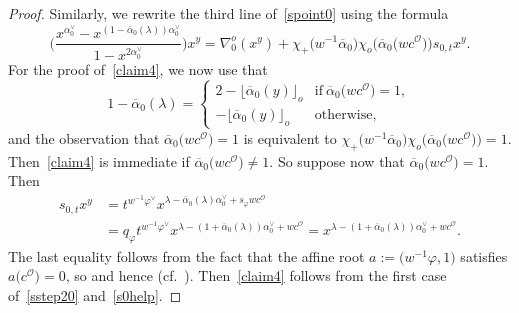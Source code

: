 \documentclass[11pt]{article}
\numberwithin{equation}{section}
\numberwithin{equation}{section}
\begin{document}
\begin{proof}
Similarly, we rewrite the third line of~\eqref{spoint0} using the formula
\begin{equation}\label{claim4}
\Biggl(\frac{x^{\alpha_0^\vee}-x^{(1-\overline{\alpha}_0(\lambda))\alpha_0^\vee}}{1-x^{2\alpha_0^\vee}}\Biggr)x^y=
\nabla_0^o(x^y)+
\chi_+\bigl(w^{-1}\overline{\alpha}_0\bigr)\chi_o\bigl(\overline{\alpha}_0\bigl(wc^\mathcal{O}\bigr)\bigr)
s_{0,t}x^y.
\end{equation}
For the proof of~\eqref{claim4}, we now use that
\begin{equation}\label{sstep20}
1-\overline{\alpha}_0(\lambda)=
\begin{cases}
2-\lfloor\overline{\alpha}_0(y)\rfloor_o &\text{if}\ \overline{\alpha}_0\bigl(wc^\mathcal{O}\bigr)=1,\\
-\lfloor\overline{\alpha}_0(y)\rfloor_o &\text{otherwise},
\end{cases}
\end{equation}
and the observation that $\overline{\alpha}_0\bigl(wc^\mathcal{O}\bigr)=1$ is equivalent to
$\chi_+\bigl(w^{-1}\overline{\alpha}_0\bigr)\chi_o\bigl(\overline{\alpha}_0\bigl(wc^\mathcal{O}\bigr)\bigr)\!=\!1$. Then~\eqref{claim4} is immediate if $\overline{\alpha}_0\bigl(wc^\mathcal{O}\bigr)\not=1$.
So suppose now that $\overline{\alpha}_0\bigl(wc^\mathcal{O}\bigr)=1$. Then
\begin{align}
s_{0,t}x^y
&=t^{w^{-1}\varphi^\vee}x^{\lambda-\overline{\alpha}_0(\lambda)\alpha_0^\vee+s_\varphi wc^\mathcal{O}}\nonumber\\
&=q_\varphi t^{w^{-1}\varphi^\vee}x^{\lambda-(1+\overline{\alpha}_0(\lambda))\alpha_0^\vee+wc^\mathcal{O}}=
x^{\lambda-(1+\overline{\alpha}_0(\lambda))\alpha_0^\vee+wc^\mathcal{O}}.\label{s0help}
\end{align}
The last equality follows from the fact that the affine root $a:=\bigl(w^{-1}\varphi,1\bigr)$ satisfies $a\bigl(c^\mathcal{O}\bigr)=0$, so  and hence
 (cf.~\cite[Lemma 3.4]{SSV2}). Then~\eqref{claim4} follows from the first case of~\eqref{sstep20} and~\eqref{s0help}.



\end{proof}
\end{document}

